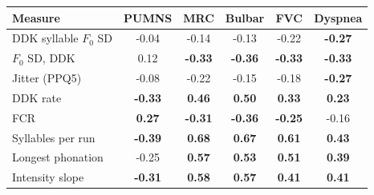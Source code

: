 \begin{tabular}{@{}lccccc@{}}
\toprule
Measure & PUMNS & MRC & Bulbar & FVC & Dyspnea \\
\midrule
DDK syllable $F_0$ SD & -0.04 & -0.14 & -0.13 & -0.22 & \textbf{-0.27} \\
$F_0$ SD, DDK & 0.12 & \textbf{-0.33} & \textbf{-0.36} & \textbf{-0.33} & \textbf{-0.33} \\
Jitter (PPQ5) & -0.08 & -0.22 & -0.15 & -0.18 & \textbf{-0.27} \\
DDK rate & \textbf{-0.33} & \textbf{0.46} & \textbf{0.50} & \textbf{0.33} & \textbf{0.23} \\
FCR & \textbf{0.27} & \textbf{-0.31} & \textbf{-0.36} & \textbf{-0.25} & -0.16 \\
Syllables per run & \textbf{-0.39} & \textbf{0.68} & \textbf{0.67} & \textbf{0.61} & \textbf{0.43} \\
Longest phonation & -0.25 & \textbf{0.57} & \textbf{0.53} & \textbf{0.51} & \textbf{0.39} \\
Intensity slope & \textbf{-0.31} & \textbf{0.58} & \textbf{0.57} & \textbf{0.41} & \textbf{0.41} \\
\bottomrule
\end{tabular}
